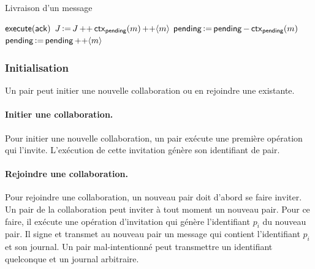 \begin{algorithm}[ht]
\caption{Livraison d'un message}\label{alg:full-log-deliver}
\begin{algorithmic}[1]
                \State $\operatorname{\mathsf{execute}}(\operatorname{\mathsf{ack}})$
            \EndIf
            \State $J \assign J \lappend \trm{ctx}_{\trm{pending}}(m) \lappend \tuple*{m}$
            \State $\operatorname{\mathsf{pending}} \operatorname{\vcentcolon=} \operatorname{\mathsf{pending}} - \operatorname{\mathsf{ctx}}_{\operatorname{\mathsf{pending}}}(m)$
        \Else
            \State $\trm{pending} \assign \trm{pending} \lappend \tuple*{m}$
        \EndIf
    \EndIf
\EndProcedure
\end{algorithmic}
\end{algorithm}


\subsubsection{Initialisation}

Un pair peut initier une nouvelle collaboration ou en rejoindre une existante.

\paragraph{Initier une collaboration.}
Pour initier une nouvelle collaboration, un pair exécute une première opération qui l'invite.
L'exécution de cette invitation génère son identifiant de pair.


\paragraph{Rejoindre une collaboration.}
Pour rejoindre une collaboration, un nouveau pair doit d'abord se faire inviter.
Un pair de la collaboration peut inviter à tout moment un nouveau pair.
Pour ce faire, il exécute une opération d'invitation qui génère l'identifiant $p_i$ du nouveau pair.
Il signe et transmet au nouveau pair un message qui contient l'identifiant $p_i$ et son journal.
Un pair mal-intentionné peut transmettre un identifiant quelconque et un journal arbitraire.

